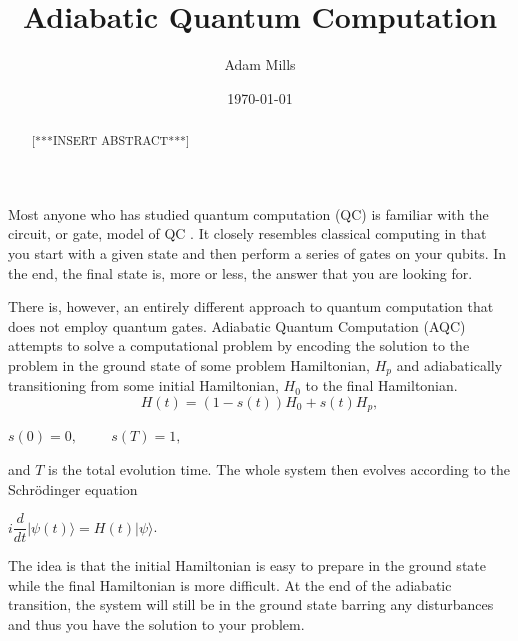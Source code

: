 \documentclass[%
 reprint,
 amsmath,amssymb,
 aps,
]{revtex4-1}
\begin{document}

\title{Adiabatic Quantum Computation}%

\author{Adam Mills}

\date{\today}%

\begin{abstract}
[***INSERT ABSTRACT***]
\end{abstract}

\maketitle



   Most anyone who has studied quantum computation (QC) is familiar with the circuit, or gate, model of QC \cite{Deutsch73}. It closely resembles classical computing in that you start with a given state and then perform a series of gates on your qubits. In the end, the final state is, more or less, the answer that you are looking for. 

   There is, however, an entirely different approach to quantum computation that does not employ quantum gates. Adiabatic Quantum Computation (AQC) attempts to solve a computational problem by encoding the solution to the problem in the ground state of some problem Hamiltonian, $H_p$ and adiabatically transitioning from some initial Hamiltonian, $H_0$ to the final Hamiltonian\cite{RevModPhys.90.015002}. 
	\begin{equation}
		H(t) = (1-s(t))H_0 + s(t)H_p, 
		\label{eq:Ht}
	\end{equation}
	\begin{center}
		$s(0) = 0, \hspace{1cm} s(T) = 1,$
	\end{center}
and $T$ is the total evolution time. The whole system then evolves according to the Schr{\"o}dinger equation
 	\begin{center}
		$i\dfrac{d}{dt}\vert\psi(t)\rangle = H(t)\vert\psi\rangle$.
	\end{center}
	
   The idea is that the initial Hamiltonian is easy to prepare in the ground state while the final Hamiltonian is more difficult. At the end of the adiabatic transition, the system will still be in the ground state barring any disturbances and thus you have the solution to your problem.
   
\end{document}
